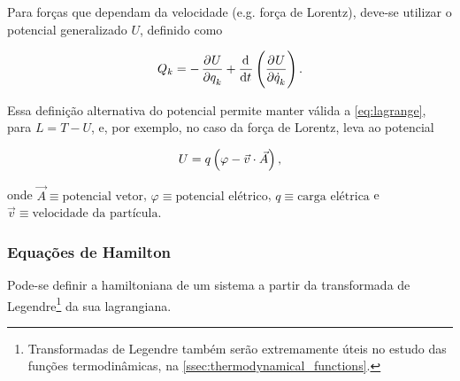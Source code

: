 Para forças que dependam da velocidade (e.g. força de Lorentz), deve-se utilizar
o potencial generalizado $U$, definido como

\begin{equation*}
    Q_k = - \dpd{U}{q_k} + \dod{}{t} \del{\dpd{U}{\dot q_k}} \text{.}
\end{equation*}

Essa definição alternativa do potencial permite manter válida a
\autoref{eq:lagrange}, para $L = T - U$, e, por exemplo, no caso da força de
Lorentz, leva ao potencial

\begin{equation*}
    U = q \del{\varphi - {\vec v} \cdot {\vec A}} \text{,}
\end{equation*}

onde $\vec A \equiv \text{potencial vetor}$, $\varphi \equiv \text{potencial
elétrico}$, $q \equiv \text{carga elétrica}$ e $\vec v \equiv \text{velocidade
da partícula}$.

\subsubsection{Equações de Hamilton}
\label{sssec:hamilton}

Pode-se definir a hamiltoniana de um sistema a partir da transformada de
Legendre\footnote{Transformadas de Legendre também serão extremamente úteis no
estudo das funções termodinâmicas, na \autoref{ssec:thermodynamical_functions}.}
da sua lagrangiana.


